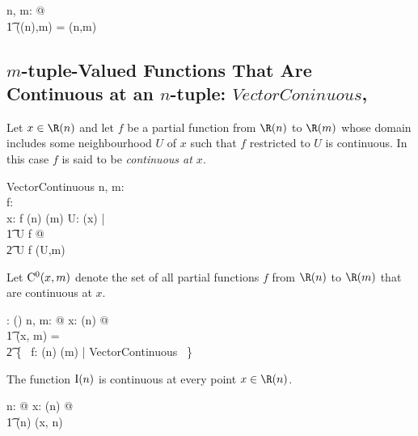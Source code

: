 \documentclass{amsart}
\begin{document}
\begin{remark}

\begin{zed}
	\forall n, m: \nat @ \\
	\t1	\CzeroSubsetRtupRtup(\Rtup(n),m) = \CzeroRtupRtup(n,m)
\end{zed}

\end{remark}

\subsection{$m$-tuple-Valued Functions That Are Continuous at an $n$-tuple: 
$VectorConinuous$, }

Let $x \in \Rtup(n)$ and let $f$ be a partial function from $\Rtup(n)$ to $\Rtup(m)$
whose domain includes some neighbourhood $U$ of $x$ such that $f$ restricted to $U$ is continuous.
In this case $f$ is said to be {\it continuous at $x$}.

\begin{schema}{VectorContinuous}
	n, m: \nat \\
	f: \Rinf \pfun \Rinf \\
	x: \Rinf
\where
	f \in \Rtup(n) \pfun \Rtup(m)
\also
	\exists U: \neighRinf(x) | \\
	\t1	U \subseteq \dom f @ \\
	\t2		U \dres f \in \CzeroSubsetRtupRtup(U,m)
\end{schema}

Let $\operatorname{C^0}(x,m)$ denote the set of all partial functions $f$ from $\Rtup(n)$ to $\Rtup(m)$
that are continuous at $x$.

\begin{axdef}
	\CzeroPointRtupRtup: \Rinf \cross \nat \fun \power (\Rinf \pfun \Rinf)
\where
	\forall n, m: \nat @ \forall x: \Rtup(n)  @ \\
	\t1	\CzeroPointRtupRtup(x, m) = \\
	\t2		\{~ f: \Rtup(n) \pfun \Rtup(m) | VectorContinuous ~\}
\end{axdef}

\begin{example}
The function $\operatorname{I}(n)$ is continuous at every point $x \in \Rtup(n)$.

\begin{zed}
	\forall n: \nat @ \forall x: \Rtup(n) @ \\
	\t1	\idRtup(n) \in \CzeroPointRtupRtup(x, n)
\end{zed}

\end{example}
\end{document}
